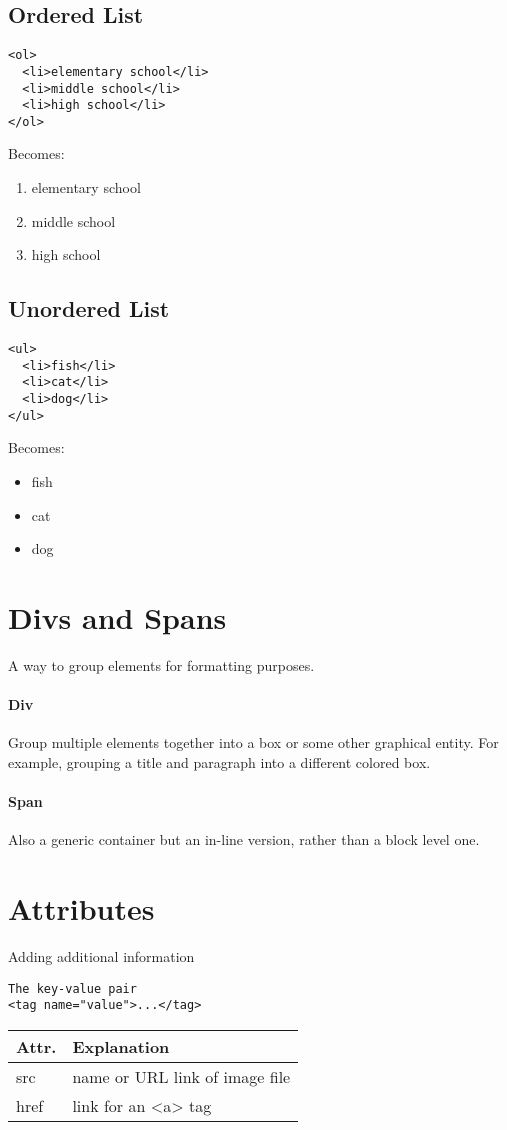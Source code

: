 \documentclass{article}
\begin{document}
\subsection{Ordered List}
\begin{verbatim}
<ol>
  <li>elementary school</li>
  <li>middle school</li>
  <li>high school</li>
</ol>
\end{verbatim}
Becomes:
\begin{enumerate}
	\itemsep0em
	\item elementary school
	\item middle school
	\item high school
\end{enumerate}
\subsection{Unordered List}
\begin{verbatim}
<ul>
  <li>fish</li>
  <li>cat</li>
  <li>dog</li>
</ul>
\end{verbatim}
Becomes:
\begin{itemize}
	\itemsep0em
	\item fish
	\item cat
	\item dog
\end{itemize}

\section{Divs and Spans}
A way to group elements for formatting purposes.
\paragraph*{Div}
Group multiple elements together into a box or some other graphical entity. For example, grouping a title and paragraph into a different colored box.
\paragraph*{Span}
Also a generic container but an in-line version, rather than a block level one.

\section{Attributes}
Adding additional information
\begin{verbatim}
The key-value pair
<tag name="value">...</tag>
\end{verbatim}

\begin{center}
	\begin{tabular}{| l | p{10cm} |}
		\hline
		\textbf{Attr.} & \textbf{Explanation} \\ \hline
		src & name or URL link of image file \\ \hline
		href & link for an <a> tag \\ \hline
	\end{tabular}
\end{center}
\end{document}
